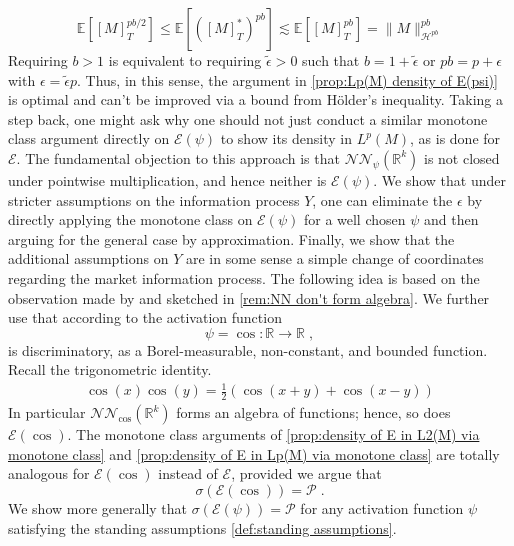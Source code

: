\documentclass[11pt]{report}
\theoremstyle{plain} %
\theoremstyle{definition} %
\theoremstyle{remark} %
\begin{document}
\begin{equation}
    \mathbb{E}[[M]_T^{pb/2}]\leq\mathbb{E}[([M]_T^*)^{pb}]\lesssim  \mathbb{E}[[M]_T^{pb}]=\lVert M\rVert_{\mathcal{H}^{pb}}^{pb}
\end{equation}
Requiring \(b>1\) is equivalent to requiring \(\tilde{\epsilon}>0\) such that \(b=1+\tilde{\epsilon}\) or \(pb=p+\epsilon\) with \(\epsilon=\tilde{\epsilon}p\). Thus, in this sense, the argument in \cref{prop:Lp(M) density of E(psi)} is optimal and can't be improved via a bound from Hölder's inequality. Taking a step back, one might ask why one should not just conduct a similar monotone class argument directly on \(\mathcal{E}(\psi)\) to show its density in \(L^p(M)\), as is done for \(\mathcal{E}\). The fundamental objection to this approach is that \(\mathcal{NN}_{\psi}(\mathbb{R}^k)\) is not closed under pointwise multiplication, and hence neither is \(\mathcal{E}(\psi)\). We show that under stricter assumptions on the information process \(Y\), one can eliminate the \(\epsilon\) by directly applying the monotone class on \(\mathcal{E}(\psi)\) for a well chosen \(\psi\) and then arguing for the general case by approximation. Finally, we show that the additional assumptions on \(Y\) are in some sense a simple change of coordinates regarding the market information process.
\bigbreak
The following idea is based on the observation made by \parencite{HornikStinchcombeWhite1989UniversalApproximators} and sketched in \cref{rem:NN don't form algebra}. We further use that according to \parencite[Thm.~2]{Hornik1991} the activation function 
\begin{equation}
    \psi=\cos:\mathbb{R}\to\mathbb{R}\;,
\end{equation}
is discriminatory, as a Borel-measurable, non-constant, and bounded function. Recall the trigonometric identity.
\begin{align}
    \cos(x)\cos(y)=\frac{1}{2}(\cos(x+y)+\cos(x-y))
\end{align}
In particular \(\mathcal{NN}_{\cos}(\mathbb{R}^k)\) forms an algebra of functions; hence, so does \(\mathcal{E}(\cos)\). The monotone class arguments of \cref{prop:density of E in L2(M) via monotone class} and \cref{prop:density of E in Lp(M) via monotone class} are totally analogous for \(\mathcal{E}(\cos)\) instead of \(\mathcal{E}\), provided we argue that 
\begin{equation}
    \sigma(\mathcal{E}(\cos))=\mathcal{P}\;.
\end{equation}
We show more generally that  \(\sigma(\mathcal{E}(\psi))=\mathcal{P}\) for any activation function \(\psi\) satisfying the standing assumptions \cref{def:standing assumptions}. 
\end{document}
